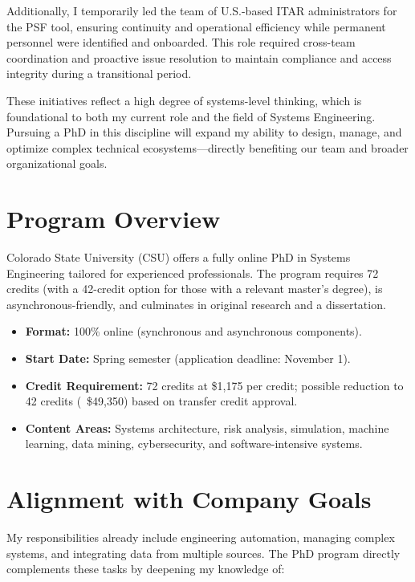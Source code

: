 \documentclass[11pt]{article}
\begin{document}
Additionally, I temporarily led the team of U.S.-based ITAR administrators for the PSF tool, ensuring continuity and operational efficiency while permanent personnel were identified and onboarded. This role required cross-team coordination and proactive issue resolution to maintain compliance and access integrity during a transitional period.

These initiatives reflect a high degree of systems-level thinking, which is foundational to both my current role and the field of Systems Engineering. Pursuing a PhD in this discipline will expand my ability to design, manage, and optimize complex technical ecosystems—directly benefiting our team and broader organizational goals.

\section{Program Overview}

Colorado State University (CSU) offers a fully online PhD in Systems Engineering tailored for experienced professionals. The program requires 72 credits (with a 42-credit option for those with a relevant master's degree), is asynchronous-friendly, and culminates in original research and a dissertation.

\begin{itemize}
    \item \textbf{Format:} 100\% online (synchronous and asynchronous components).
    \item \textbf{Start Date:} Spring semester (application deadline: November 1).
    \item \textbf{Credit Requirement:} 72 credits at \$1,175 per credit; possible reduction to 42 credits (~\$49,350) based on transfer credit approval.
    \item \textbf{Content Areas:} Systems architecture, risk analysis, simulation, machine learning, data mining, cybersecurity, and software-intensive systems.
\end{itemize}

\section{Alignment with Company Goals}

My responsibilities already include engineering automation, managing complex systems, and integrating data from multiple sources. The PhD program directly complements these tasks by deepening my knowledge of:
\end{document}
